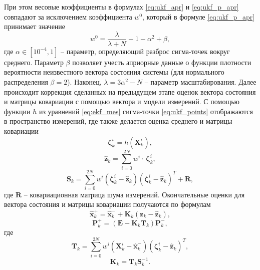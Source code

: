 При этом весовые коэффициенты в формулах \eqref{eq:ukf_apr} и \eqref{eq:ukf_p_apr} совпадают за исключением коэффициента  ${w^0}$, который в формуле \eqref{eq:ukf_p_apr} принимает значение \cite{Kulikova01}
\begin{equation}
w^0 = \frac{{{\lambda }}}{{{{\lambda }} + N}} + 1 - {{{\alpha }}^2} + {{\beta }},
\end{equation}
где
${{\alpha }} \in \left[ {{{10}^{ - 4}},1} \right]$
-- параметр, определяющий разброс сигма-точек вокруг среднего.
Параметр ${{\beta }}$  позволяет учесть априорные данные о функции плотности вероятности неизвестного вектора состояния системы (для нормального распределения  ${{\beta }} = 2$). Наконец, ${{\lambda }} = 3{{{\alpha }}^2} - N$ -- параметр масштабирования.
Далее происходит коррекция сделанных на предыдущем этапе оценок вектора состояния и матрицы ковариации с помощью вектора и модели измерений.
С помощью функции $h$ из уравнений \eqref{eq:ekf_mes} сигма-точки \eqref{eq:ukf_points} отображаются в пространство измерений, где также делается оценка среднего и матрицы ковариации
\begin{equation}
{\bm{\zeta }}_k^i = h\left( {{\bm{X}}_k^i} \right),
\end{equation}
\begin{equation}
{{{\bm{\hat z}}}_k} = \sum\limits_{i = 0}^{2N} {{w^i} \cdot } \,{\bm{\zeta }}_k^i,
\end{equation}
\begin{equation} \label{eq:ukf_s_k}
{{\bm{S}}_k} = \sum\limits_{i = 0}^{2N} {{w^i}\left( {{\bm{\zeta }}_k^i - {{{\bm{\hat z}}}_k}} \right)} {\left( {{\bm{\zeta }}_k^i - {{{\bm{\hat z}}}_k}} \right)^{{T}}} + {\bm{R}},
\end{equation}
где $\bm R$ -- ковариационная матрица шума измерений. Окончательные оценки для вектора состояния и матрицы ковариации получаются по формулам
\begin{equation}
{\bm{\hat x}}_k^ +  = {\bm{\hat x}}_k^ -  + {{\bm{K}}_k}({{\bm{z}}_k} - {{{\bm{\hat z}}}_k}),
\end{equation}
\begin{equation}
{\bm{P}}_k^ +  = \left( {{\bm{E}} - {{\bm{K}}_k}{{\bm{T}}_k}} \right){\bm{P}}_k^ - ,
\end{equation}
где
\begin{equation}
{{\bm{T}}_k} = \sum\limits_{i = 0}^{2N} {{w^i}\left( {{\bm{X}}_k^i - {\bm{\hat x}}_k^ - } \right)} {\left( {{\bm{\zeta }}_k^i - {{{\bm{\hat z}}}_k}} \right)^{{T}}},
\end{equation}
\begin{equation}
{{\bm{K}}_k} = {{\bm{T}}_k}{\bm{S}}_k^{ - 1}.
\end{equation}

